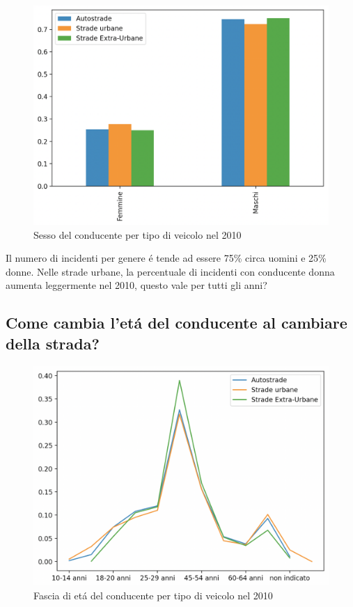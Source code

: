 \documentclass[a4paper]{report}
\begin{document}
\begin{figure}[!ht]
    \includegraphics[width=\linewidth]{../src/incidenti/incidenti_senza_coords/tipo_veicoli/uomo-donna.png}
    \caption{Sesso del conducente per tipo di veicolo nel 2010}
    \label{fig:differenza_uomo_donna}
\end{figure}

Il numero di incidenti per genere \'e tende ad essere 75\% circa uomini e 25\% donne.
Nelle strade  urbane, la percentuale di incidenti con conducente donna aumenta leggermente nel 2010, 
questo vale per tutti gli anni?



\newpage
\subsection{Come cambia l'et\'a del conducente al cambiare della strada?}

\begin{figure}[!ht]
    \includegraphics[width=\linewidth]{../src/incidenti/incidenti_senza_coords/tipo_veicoli/differenza_eta.png}
    \caption{Fascia di et\'a del conducente per tipo di veicolo nel 2010}
    \label{fig:differenza_eta}
\end{figure}
\end{document}
